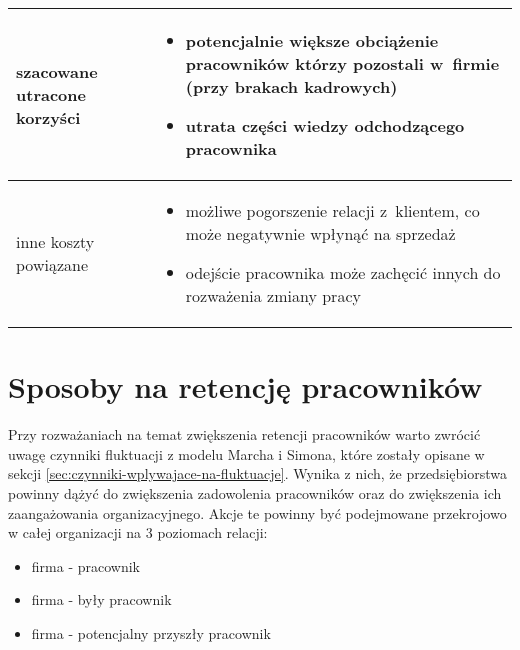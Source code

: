 \begin{minipage}{\textwidth}
\begin{table}[H]
\begin{center}
\begin{tabular}{|P{.15\textwidth}|P{.75\textwidth}|}
                         szacowane utracone korzyści &
                         \begin{itemize}
                             \item potencjalnie większe obciążenie pracowników którzy pozostali w~firmie (przy brakach kadrowych)
                             \item utrata części wiedzy odchodzącego pracownika
                         \end{itemize} \\
                         \hline

                         inne koszty powiązane &
                         \begin{itemize}
                             \item możliwe pogorszenie relacji z~klientem, co może negatywnie wpłynąć na sprzedaż
                             \item odejście pracownika może zachęcić innych do rozważenia zmiany pracy
                         \end{itemize} \\
                         \hline
                     \end{tabular}
                 \end{center}
                 \raggedright{}
                 \vspace{0.75cm}
             \end{table}
\end{minipage}


\section{Sposoby na retencję pracowników}\label{sec:retencja}

Przy rozważaniach na temat zwiększenia retencji pracowników warto zwrócić uwagę czynniki fluktuacji z modelu Marcha i Simona,
które zostały opisane w sekcji \ref{sec:czynniki-wplywajace-na-fluktuacje}.
Wynika z nich, że przedsiębiorstwa powinny dążyć do zwiększenia zadowolenia pracowników oraz do zwiększenia ich zaangażowania organizacyjnego.
Akcje te powinny być podejmowane przekrojowo w całej organizacji na 3 poziomach relacji:
\begin{itemize}
    \item firma - pracownik
    \item firma - były pracownik
    \item firma - potencjalny przyszły pracownik
\end{itemize}


